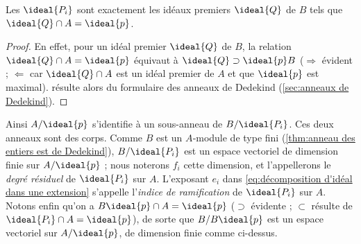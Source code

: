 \documentclass[11pt, useosf,
  title in boldface,
  theorem in new line,
  theorem numbering = section,
  number theorems separately,
]{simplivre}
\begin{document}
    \begin{proposition}\label{prop:facteurs premiers dans la décomposition d'idéal dans une extension}
        Les \( \ideal{P_i} \) sont exactement les idéaux premiers \( \ideal{Q} \) de \( B \) tels que \( \ideal{Q} \cap A = \ideal{p} \).
    \end{proposition}
    \begin{proof}
        En effet, pour un idéal premier \( \ideal{Q} \) de \( B \), la relation \( \ideal{Q} \cap A = \ideal{p} \) équivaut à \( \ideal{Q} \supset \ideal{p} B \) (\( \Rightarrow \) évident ; \( \Leftarrow \) car \( \ideal{Q} \cap A \) est un idéal premier de \( A \) et que \( \ideal{p} \) est maximal).  résulte alors du formulaire des anneaux de Dedekind (\cref{sec:anneaux de Dedekind}).
    \end{proof}

    Ainsi \( A/\ideal{p} \) s'identifie à un sous-anneau de \( B/\ideal{P_i} \). Ces deux anneaux sont des corps. Comme \( B \) est un \( A \)‑module de type fini (\cref{thm:anneau des entiers est de Dedekind}), \( B/\ideal{P_i} \) est un espace vectoriel de dimension finie sur \( A/\ideal{p} \) ; nous noterons \( f_i \) cette dimension, et l'appellerons le \emph{degré résiduel} de \( \ideal{P_i} \) sur \( A \). L'exposant \( e_i \) dans \eqref{eq:décomposition d'idéal dans une extension} s'appelle l'\emph{indice de ramification} de \( \ideal{P_i} \) sur \( A \). Notons enfin qu'on a \( B \ideal{p} \cap A = \ideal{p} \) (\( \supset \) évidente ; \( \subset \) résulte de \( \ideal{P_i} \cap A = \ideal{p} \)), de sorte que \( B/B\ideal{p} \) est un espace vectoriel sur \( A/\ideal{p} \), de dimension finie comme ci-dessus.
\end{document}
